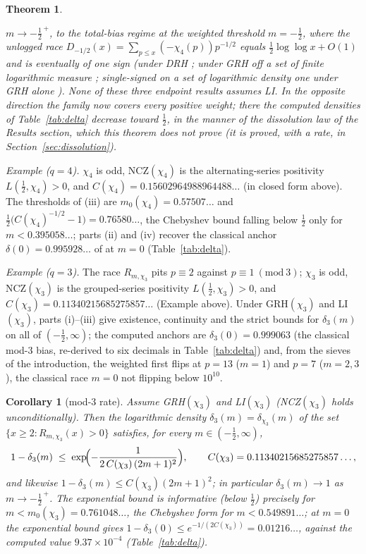 \documentclass[11pt]{article}
\newtheorem{theorem}{Theorem}
\newtheorem{corollary}{Corollary}
\begin{document}
\begin{theorem}
\begin{enumerate}
$m\to-\tfrac12^{\,+}$, to the
total-bias regime at the weighted threshold $m=-\tfrac12$, where the
unlogged race $D_{-1/2}(x)=\sum_{p\le x}(-\chi_4(p))p^{-1/2}$ equals
$\tfrac12\log\log x+O(1)$ and is eventually of one sign (under DRH
\cite{AK23}; under GRH off a set of finite logarithmic measure
\cite{Sheth24}; single-signed on a set of logarithmic density one under
GRH alone \cite{Hay25}). None of these three endpoint results assumes
LI. In the opposite direction the family now covers every positive
weight; there the computed densities of Table~\ref{tab:delta} decrease
toward $\tfrac12$, in the manner of the dissolution law of the Results
section, which this theorem does not prove (it is proved, with a rate,
in Section~\ref{sec:dissolution}).
\end{enumerate}
\end{theorem}

\medskip\noindent\emph{Example ($q=4$).} $\chi_4$ is odd,
NCZ$(\chi_4)$ is the alternating-series positivity
$L(\tfrac12,\chi_4)>0$, and $C(\chi_4)=0.15602964988964488\ldots$ (in
closed form above). The thresholds of (iii) are
$m_0(\chi_4)=0.57507\ldots$ and
$\tfrac12\bigl(C(\chi_4)^{-1/2}-1\bigr)=0.76580\ldots$, the Chebyshev
bound falling below $\tfrac12$ only for $m<0.395058\ldots$; parts (ii)
and (iv) recover the classical anchor $\delta(0)=0.995928\ldots$ of
\cite{RS94,FM13} at $m=0$ (Table~\ref{tab:delta}).

\medskip\noindent\emph{Example ($q=3$).} The race $R_{m,\chi_3}$ pits
$p\equiv2$ against $p\equiv1\ (\mathrm{mod}\ 3)$; $\chi_3$ is odd,
NCZ$(\chi_3)$ is the grouped-series positivity
$L(\tfrac12,\chi_3)>0$, and
$C(\chi_3)=0.11340215685275857\ldots$ (Example above). Under
GRH$(\chi_3)$ and LI$(\chi_3)$, parts (i)--(iii) give existence,
continuity and the strict bounds for $\delta_3(m)$ on all of
$(-\tfrac12,\infty)$; the computed anchors are $\delta_3(0)=0.999063$
(the classical mod-$3$ bias, re-derived to six decimals in
Table~\ref{tab:delta}) and, from the sieves of the introduction, the
weighted first flips at $p=13$ ($m=1$) and $p=7$ ($m=2,3$), the
classical race $m=0$ not flipping below $10^{10}$.

\begin{corollary}[mod-$3$ rate]\label{cor:mod3rate}
Assume GRH$(\chi_3)$ and LI$(\chi_3)$ (NCZ$(\chi_3)$ holds
unconditionally). Then the logarithmic density
$\delta_3(m)=\delta_{\chi_3}(m)$ of the set
$\{x\ge2:R_{m,\chi_3}(x)>0\}$ satisfies, for every
$m\in(-\tfrac12,\infty)$,
\[
1-\delta_3(m)\;\le\;
\exp\!\Bigl(-\frac{1}{2\,C(\chi_3)\,(2m+1)^2}\Bigr),
\qquad
C(\chi_3)=0.11340215685275857\ldots,
\]
and likewise $1-\delta_3(m)\le C(\chi_3)(2m+1)^2$; in particular
$\delta_3(m)\to1$ as $m\to-\tfrac12^{\,+}$. The exponential bound is
informative (below $\tfrac12$) precisely for
$m<m_0(\chi_3)=0.761048\ldots$, the Chebyshev form for
$m<0.549891\ldots$; at $m=0$ the exponential bound gives
$1-\delta_3(0)\le e^{-1/(2C(\chi_3))}=0.01216\ldots$, against the
computed value $9.37\times10^{-4}$ (Table~\ref{tab:delta}).
\end{corollary}
\end{document}
